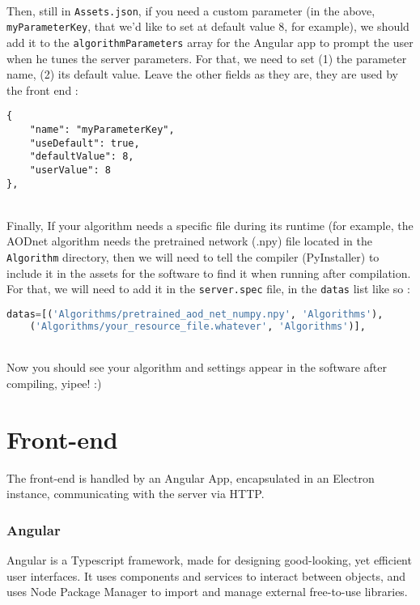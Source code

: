 \documentclass[12pt,a4paper]{article}
\begin{document}
~\\
Then, still in \texttt{Assets.json}, if you need a custom parameter (in the above, \texttt{myParameterKey}, that we'd like to set at default value 8, for example), we should add it to the \texttt{algorithmParameters} array for the Angular app to prompt the user when he tunes the server parameters. For that, we need to set (1) the parameter name, (2) its default value. Leave the other fields as they are, they are used by the front end :\\

\begin{lstlisting}
{
    "name": "myParameterKey",
    "useDefault": true,
    "defaultValue": 8,
    "userValue": 8
},
\end{lstlisting}

~\\
Finally, If your algorithm needs a specific file during its runtime (for example, the AODnet algorithm needs the pretrained network (.npy) file located in the \texttt{Algorithm} directory, then we will need to tell the compiler (PyInstaller) to include it in the assets for the software to find it when running after compilation. For that, we will need to add it in the \texttt{server.spec} file, in the \texttt{datas} list like so :\\

\begin{lstlisting}[language=Python]
datas=[('Algorithms/pretrained_aod_net_numpy.npy', 'Algorithms'),
	('Algorithms/your_resource_file.whatever', 'Algorithms')],
\end{lstlisting}

~\\
Now you should see your algorithm and settings appear in the software after compiling, yipee! :)

\pagebreak

\part{Front-end}
\setcounter{section}{0}

The front-end is handled by an Angular App, encapsulated in an Electron instance, communicating with the server via HTTP.

\section{Angular}

Angular is a Typescript framework, made for designing good-looking, yet efficient user interfaces. It uses components and services to interact between objects, and uses Node Package Manager to import and manage external free-to-use libraries.
\end{document}
